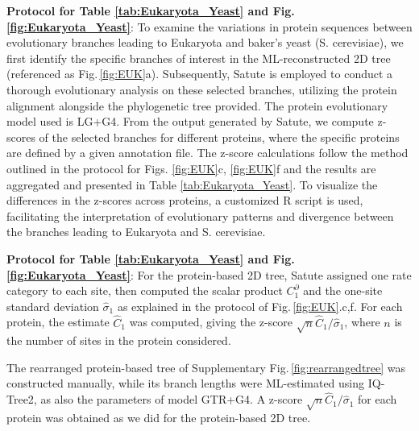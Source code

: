 \noindent \textbf{Protocol for  Table \ref{tab:Eukaryota_Yeast}  and Fig.\,\ref{fig:Eukaryota_Yeast}}:
 To examine the variations in protein sequences between evolutionary branches leading to Eukaryota and baker's yeast (S. cerevisiae), we first identify the specific branches of interest in the ML-reconstructed 2D tree (referenced as Fig.\,\ref{fig:EUK}a). Subsequently, Satute is employed to conduct a thorough evolutionary analysis on these selected branches, utilizing the protein alignment alongside the phylogenetic tree provided. The protein evolutionary model used is LG+G4. From the output generated by Satute, we compute z-scores of the selected branches for different proteins, where the specific proteins are defined by a given annotation file. The z-score calculations follow the method outlined in the protocol for Figs. \ref{fig:EUK}c, \ref{fig:EUK}f  and the results are aggregated and presented in Table \ref{tab:Eukaryota_Yeast}. To visualize the differences in the z-scores across proteins, a customized R script is used, facilitating the interpretation of evolutionary patterns and divergence between the branches leading to Eukaryota and S. cerevisiae.

        
\noindent \textbf{Protocol for  Table \ref{tab:Eukaryota_Yeast}  and Fig.\,\ref{fig:Eukaryota_Yeast}}: For the protein-based 2D tree, Satute assigned one rate category to each site, then computed the scalar product $C_1^\partial$  and the one-site standard deviation  $\hat{\sigma}_1$ as explained in the protocol of Fig.\,\ref{fig:EUK}.c,f. For each protein, the estimate $\hat{C}_1$ was computed, giving the z-score $\sqrt{n}\hat{C}_1/\hat{\sigma}_1$, where $n$ is the number of sites in the protein considered. 

\medskip

The rearranged protein-based tree of Supplementary Fig.\,\ref{fig:rearrangedtree} was constructed manually, while its branch lengths were ML-estimated using IQ-Tree2, as also the parameters of model GTR+G4. A z-score $\sqrt{n}\hat{C}_1/\hat{\sigma}_1$ for each protein was obtained as we did for the protein-based 2D tree.

\newpage


